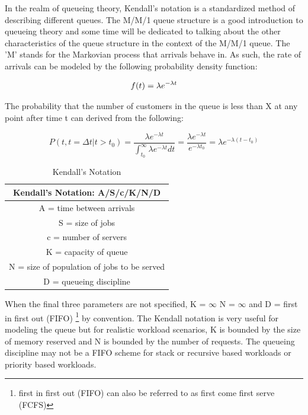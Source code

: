 \documentclass[letterpaper, 10 pt, conference]{ieeeconf}
\begin{document}
In the realm of queueing theory, Kendall's notation is a standardized method of describing different queues.  The M/M/1 queue structure is a good introduction to queueing theory and some time will be dedicated to talking about the other characteristics of the queue structure in the context of the M/M/1 queue.  The 'M' stands for the Markovian process that arrivals behave in.  As such, the rate of arrivals can be modeled by the following probability density function:

\begin{equation}
f(t) = \lambda e^{-\lambda t}\\
\end{equation}

The probability that the number of customers in the queue is less than X at any point after time t can derived from the following:

\begin{equation}
P(t,t= \Delta t | t > t_0) = \frac{\lambda e^{-\lambda t}} { \int_{t_0}^{\infty} \lambda e^{-\lambda t} dt} = \frac {\lambda e^{-\lambda t}}{e^{-\lambda t_0}} = \lambda e^{-\lambda (t-t_0)}
\end{equation}

\begin{table}
  \centering
    \begin{tabular}{|c|}
    \hline
    Kendall’s Notation: A/S/c/K/N/D \\
    \hline
A = time between arrivals \\
S = size of jobs \\
c = number of servers \\
K = capacity of queue \\
N = size of population of jobs to be served \\
D = queueing discipline \\
    \hline
    \end{tabular}
  \caption{Kendall's Notation}
\end{table}

When the final three parameters are not specified, K = $\infty$ N = $\infty$ and D = first in first out (FIFO) \footnote{first in first out (FIFO) can also be referred to as first come first serve (FCFS)} by convention.  The Kendall notation is very useful for modeling the queue but for realistic workload scenarios, K is bounded by the size of memory reserved and N is bounded by the number of requests.  The queueing discipline may not be a FIFO scheme for stack or recursive based workloads or priority based workloads.
\end{document}
